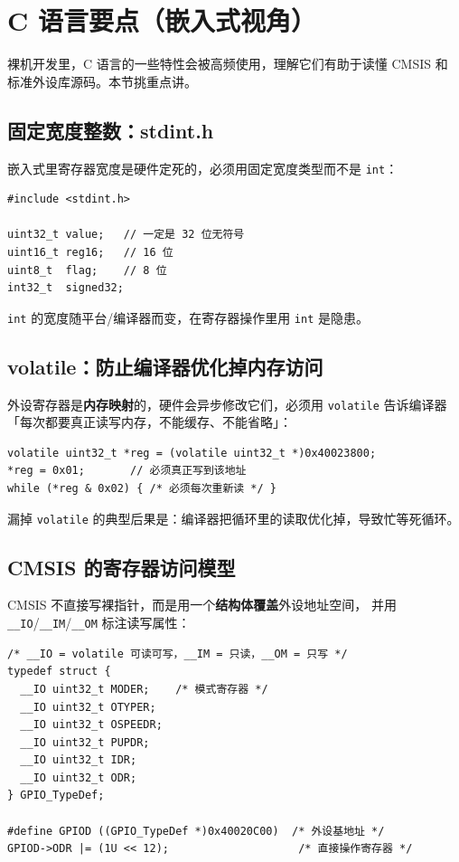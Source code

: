 \section{C 语言要点（嵌入式视角）}

裸机开发里，C 语言的一些特性会被高频使用，理解它们有助于读懂 CMSIS 和
标准外设库源码。本节挑重点讲。

\subsection{固定宽度整数：stdint.h}

嵌入式里寄存器宽度是硬件定死的，必须用固定宽度类型而不是 \texttt{int}：

\begin{lstlisting}[style=code]
#include <stdint.h>

uint32_t value;   // 一定是 32 位无符号
uint16_t reg16;   // 16 位
uint8_t  flag;    // 8 位
int32_t  signed32;
\end{lstlisting}

\texttt{int} 的宽度随平台/编译器而变，在寄存器操作里用 \texttt{int} 是隐患。

\subsection{volatile：防止编译器优化掉内存访问}

外设寄存器是\textbf{内存映射}的，硬件会异步修改它们，必须用
\texttt{volatile} 告诉编译器「每次都要真正读写内存，不能缓存、不能省略」：

\begin{lstlisting}[style=code]
volatile uint32_t *reg = (volatile uint32_t *)0x40023800;
*reg = 0x01;       // 必须真正写到该地址
while (*reg & 0x02) { /* 必须每次重新读 */ }
\end{lstlisting}

漏掉 \texttt{volatile} 的典型后果是：编译器把循环里的读取优化掉，导致忙等死循环。

\subsection{CMSIS 的寄存器访问模型}

CMSIS 不直接写裸指针，而是用一个\textbf{结构体覆盖}外设地址空间，
并用 \texttt{\_\_IO}/\texttt{\_\_IM}/\texttt{\_\_OM} 标注读写属性：

\begin{lstlisting}[style=code]
/* __IO = volatile 可读可写，__IM = 只读，__OM = 只写 */
typedef struct {
  __IO uint32_t MODER;    /* 模式寄存器 */
  __IO uint32_t OTYPER;
  __IO uint32_t OSPEEDR;
  __IO uint32_t PUPDR;
  __IO uint32_t IDR;
  __IO uint32_t ODR;
} GPIO_TypeDef;

#define GPIOD ((GPIO_TypeDef *)0x40020C00)  /* 外设基地址 */
GPIOD->ODR |= (1U << 12);                    /* 直接操作寄存器 */
\end{lstlisting}

